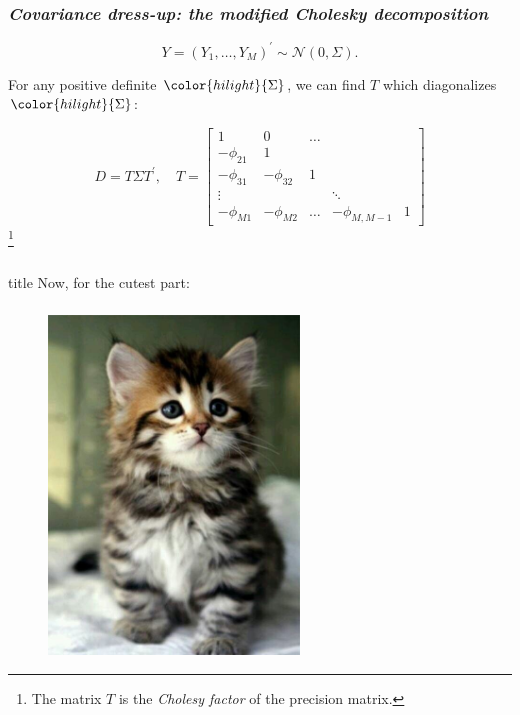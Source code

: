 \documentclass[12pt]{beamer}
\newcommand{\newthought}[1]{{\small \color{hilight} {#1}}}
\newcommand\myfootnote[1]{%
  \begingroup
  \renewcommand\thefootnote{}\footnote{#1}%
  \addtocounter{footnote}{-1}%
  \endgroup
}
\begin{document}

\begin{frame}
\frametitle{\emph{Covariance dress-up: the modified Cholesky decomposition}}

\begin{equation*}
Y = \left(Y_1, \dots, Y_M \right)^\prime \sim \mathcal{N}\left(0,\Sigma\right).
\end{equation*}

\newthought{For any positive definite} $\color{hilight}{\Sigma}$, \newthought{we can find $T$ which diagonalizes} $\color{hilight}{\Sigma}$:

\begin{equation}
D = T \Sigma T^\prime, \quad T = \begin{bmatrix} 1 & 0 & \dots & & \\ -\phi_{21} & 1 & & & \\ -\phi_{31}& -\phi_{32} &  1 & & \\ \vdots & & & \ddots & \\ -\phi_{M1} &-\phi_{M2} & \dots & -\phi_{M,M-1}& 1  \end{bmatrix}
\end{equation}
\myfootnote{The matrix $T$ is the \emph{Cholesy factor}  of the precision matrix.}
\end{frame}




\begin{frame}
\frametitle{}

\vfill
  \begin{beamercolorbox}[center]{title}
\Large Now, for the cutest part:
  \end{beamercolorbox}
  \vfill

\end{frame}




\begin{frame}
\frametitle{}
\begin{figure}
\graphicspath{{img/}}
  \includegraphics[height=9cm]{cutest-kitten-ever}
\end{figure}

\end{frame}
\end{document}
